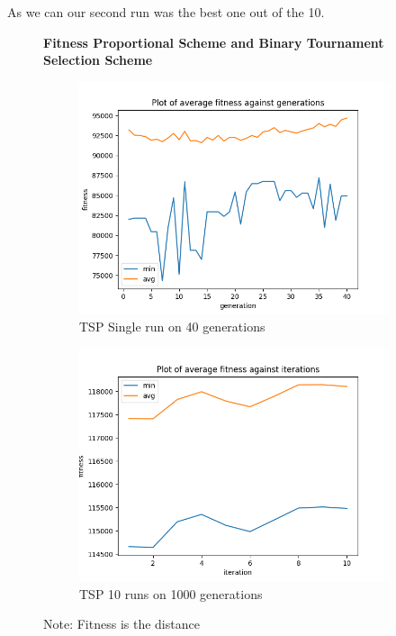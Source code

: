 \documentclass[a4paper]{exam}
\begin{document}
\begin{questions}
  As we can our second run was the best one out of the 10.

  \begin{figure}[!ht]
    \centering
    \textbf{Fitness Proportional Scheme and Binary Tournament Selection Scheme}
    \begin{subfigure}{.5\textwidth}
      \centering
      \includegraphics[width=1\linewidth]{images/tsp_fps_bt_gen.png}
      \caption{TSP Single run on 40 generations}
      \label{fig:tsp_fps_bt_sub1}
    \end{subfigure}%
    \begin{subfigure}{.5\textwidth}
      \centering
      \includegraphics[width=1\linewidth]{images/tsp_fps_bt_itr.png}
      \caption{TSP 10 runs on 1000 generations}
      \label{fig:tsp_fps_bt_sub2}
    \end{subfigure}
    \caption{Note: Fitness is the distance}
    \label{fig:tsp_fps_bt}
  \end{figure}


\end{questions}
\end{document}
